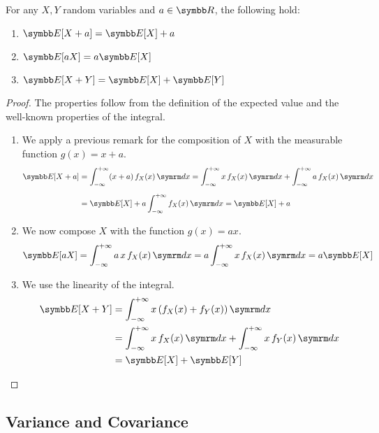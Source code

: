 \begin{proposition}
For any \(X, Y\) random variables and \(a \in \reals\), the following hold:
\begin{enumerate}
    \item \(\expectedvalue[X + a] = \expectedvalue[X] + a\)
    \item \(\expectedvalue[a X] = a \expectedvalue[X]\)
    \item \(\expectedvalue[X + Y] = \expectedvalue[X] + \expectedvalue[Y]\)
\end{enumerate}
\end{proposition}
\begin{proof}
The properties follow from the definition of the expected value and the well-known properties of the integral.
\begin{enumerate}
    \item We apply a previous remark for the composition of \(X\) with the measurable function \(g(x) = x + a\).
    \begin{align*}
        \expectedvalue[X + a] &= \int_{-\infty}^{+\infty} (x + a) \, f_X (x) \diff x
        = \int_{-\infty}^{+\infty} x \, f_X (x) \diff x + \int_{-\infty}^{+\infty} a \, f_X (x) \diff x \\[0.5em]
        &= \expectedvalue[X] + a \int_{-\infty}^{+\infty} f_X (x) \diff x
        = \expectedvalue[X] + a
    \end{align*}

    \item We now compose \(X\) with the function \(g(x) = ax\).
    \[
        \expectedvalue[a X] = \int_{-\infty}^{+\infty} a \, x \, f_X (x) \diff x = a \int_{-\infty}^{+\infty} x \, f_X (x) \diff x = a \expectedvalue[X]
    \]

    \item We use the linearity of the integral.
    \begin{align*}
        \expectedvalue[X + Y] &= \int_{-\infty}^{+\infty} x \left(f_X (x) + f_Y (x)\right) \diff x \\
        &= \int_{-\infty}^{+\infty} x \, f_X (x) \diff x + \int_{-\infty}^{+\infty} x \, f_Y (x) \diff x \\
        &= \expectedvalue[X] + \expectedvalue[Y]
    \end{align*}
\end{enumerate}
\end{proof}

\subsection*{Variance and Covariance}


